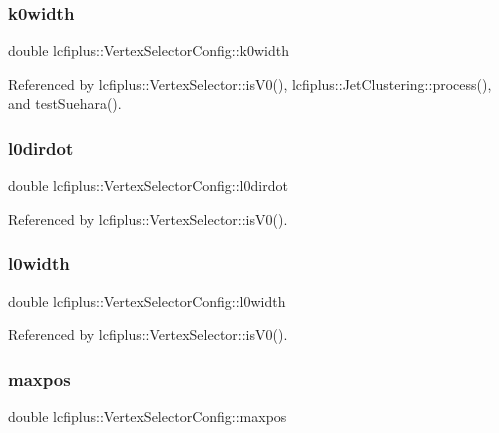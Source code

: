 \subsubsection{k0width}
{\footnotesize\ttfamily double lcfiplus\+::\+Vertex\+Selector\+Config\+::k0width}



Referenced by lcfiplus\+::\+Vertex\+Selector\+::is\+V0(), lcfiplus\+::\+Jet\+Clustering\+::process(), and test\+Suehara().

\mbox{\label{classlcfiplus_1_1VertexSelectorConfig_a8820bf8177d0431b6e399bb7c9daf0ff}} 
\subsubsection{l0dirdot}
{\footnotesize\ttfamily double lcfiplus\+::\+Vertex\+Selector\+Config\+::l0dirdot}



Referenced by lcfiplus\+::\+Vertex\+Selector\+::is\+V0().

\mbox{\label{classlcfiplus_1_1VertexSelectorConfig_ad66933c5fe6bd214fe2383e09018c31c}} 
\subsubsection{l0width}
{\footnotesize\ttfamily double lcfiplus\+::\+Vertex\+Selector\+Config\+::l0width}



Referenced by lcfiplus\+::\+Vertex\+Selector\+::is\+V0().

\mbox{\label{classlcfiplus_1_1VertexSelectorConfig_a1e1b3599f5513fa2b52f02ebc4a6fed5}} 
\subsubsection{maxpos}
{\footnotesize\ttfamily double lcfiplus\+::\+Vertex\+Selector\+Config\+::maxpos}



